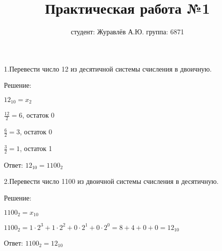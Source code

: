 \documentclass[a4paper,11pt]{article}
\title{Практическая работа №1}
\author{студент: Журавлёв А.Ю. группа: 6871}
\begin{document}
\maketitle
1.Перевести число 12 из десятичной системы счисления в двоичную.

Решение:

$12_{10}=x_2$

${\displaystyle \frac{12}{2}=6}$, остаток 0

${\displaystyle \frac{6}{2}=3}$, остаток 0

${\displaystyle \frac{3}{2}=1}$, остаток 1

Ответ: $12_{10}=1100_2$

2.Перевести число 1100 из двоичной системы счисления в десятичную.

Решение:

$1100_2=x_{10}$

$1100_2=1\cdot2^3+1\cdot2^2+0\cdot2^1+0\cdot2^0=8+4+0+0=12_{10}$

Ответ: $1100_2=12_{10}$
\end{document}
